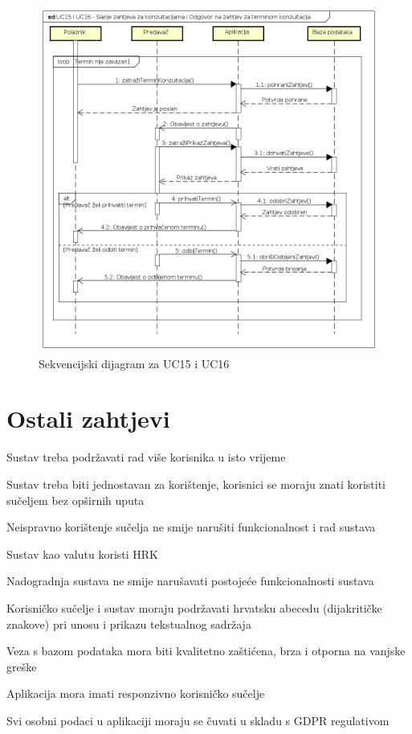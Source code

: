 					\begin{figure}[h]
						\includegraphics[scale=0.59]{dijagrami/UML_sd_UC15UC16.PNG}
						\centering
						\caption{Sekvencijski dijagram za UC15 i UC16}
						\label{fig:UML_sd_UC15UC16}
					\end{figure}
				\eject
				
		\section{Ostali zahtjevi}
		
			\begin{packed_item}
				\item Sustav treba podržavati rad više korisnika u isto vrijeme
				\item Sustav treba biti jednostavan za korištenje, korisnici se moraju znati koristiti sučeljem bez opširnih uputa
				\item Neispravno korištenje sučelja ne smije narušiti funkcionalnost i rad sustava
				\item Sustav kao valutu koristi HRK
				\item Nadogradnja sustava ne smije narušavati postojeće funkcionalnosti sustava
				\item Korisničko sučelje i sustav moraju podržavati hrvatsku abecedu (dijakritičke znakove) pri unosu i prikazu tekstualnog sadržaja
				\item Veza s bazom podataka mora biti kvalitetno zaštićena, brza i otporna na vanjske greške
				\item Aplikacija mora imati responzivno korisničko sučelje
				\item Svi osobni podaci u aplikaciji moraju se čuvati u skladu s GDPR regulativom
			\end{packed_item}
			 
			 
			 
	